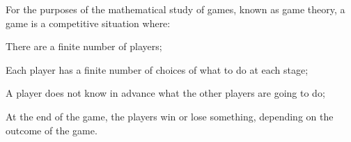 For the purposes of the mathematical study of games, known as game theory, a game is
a competitive situation where:
\par
There are a finite number of players;
\par
Each player has a finite number of choices of what to do at each stage;
\par
A player does not know in advance what the other players are going to do;
\par
At the end of the game, the players win or lose something, depending on
the outcome of the game.